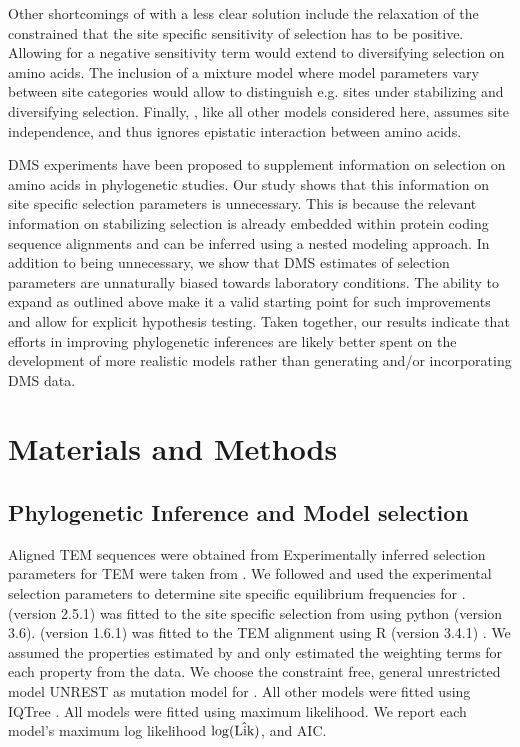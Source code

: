 \documentclass[fleqn,letterpaper]{article}
\begin{document}
Other shortcomings of \selac with a less clear solution include the relaxation of the constrained that the site specific sensitivity of selection has to be positive.
Allowing for a negative sensitivity term would extend \selac to diversifying selection on amino acids.
The inclusion of a mixture model where model parameters vary between site categories would allow to distinguish e.g. sites under stabilizing and diversifying selection.
Finally, \selac, like all other models considered here, assumes site independence, and thus ignores epistatic interaction between amino acids.

DMS experiments have been proposed to supplement information on selection on amino acids in phylogenetic studies.
Our study shows that this information on site specific selection parameters is unnecessary.
This is because the relevant information on stabilizing selection is already embedded within protein coding sequence alignments and can be inferred using a nested modeling approach.
In addition to being unnecessary, we show that DMS estimates of selection parameters are unnaturally biased towards laboratory conditions.
The ability to expand \selac as outlined above make it a valid starting point for such improvements and allow for explicit hypothesis testing.
Taken together, our results indicate that efforts in improving phylogenetic inferences are likely better spent on the development of more realistic models rather than generating and/or incorporating DMS data.


\section{Materials and Methods}

\subsection{Phylogenetic Inference and Model selection}

Aligned TEM sequences were obtained from \citet{bloom2017}
Experimentally inferred selection parameters for TEM were taken from \citet{stiffler2016}.
We followed \citep{bloom2017} and used the experimental selection parameters to determine site specific equilibrium frequencies for \phydms. 
\phydms (version 2.5.1) was fitted to the site specific selection from \citet{stiffler2016} using python (version 3.6).
\selac (version 1.6.1) was fitted to the TEM alignment using R (version 3.4.1) \citep{rcore}.
We assumed the \PC properties estimated by \citet{grantham1974} and only estimated the weighting terms for each property from the data.
We choose the constraint free, general unrestricted model UNREST \citep{Yang1994} as mutation model for \selac.
All other models were fitted using IQTree \citep{nguyen2015}.
All models were fitted using maximum likelihood.
We report each model's maximum log likelihood $\log(\hat{\text{Lik}})$, and AIC.
\end{document}
